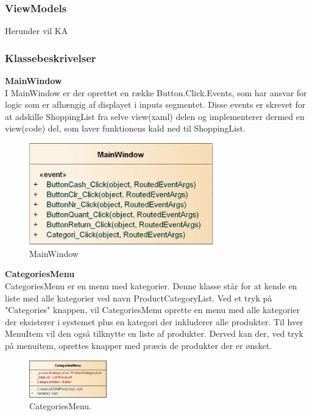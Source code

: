 \subsubsection{ViewModels} \label{VIEWMODELS}
Herunder vil \gls{KA}

\subsubsection{Klassebeskrivelser}
\textbf{MainWindow}\\
I MainWindow er der oprettet en række Button.Click.Events, som har ansvar for logic som er afhængig af displayet i inputs segmentet. Disse events er skrevet for at adskille ShoppingList fra selve view(xaml) delen og implementerer dermed en view(code) del, som laver funktionens kald ned til ShoppingList. 

\begin{figure}[H]
	\centering
	\includegraphics[width=80mm]{Systemdesign/Frontend/GUI/Pics/Main}
	\caption{MainWindow}
	\label{fig:KasseMainWindowClass}
\end{figure}

\textbf{CategoriesMenu}\\
CategoriesMenu er en menu med kategorier. Denne klasse står for at kende en liste med alle kategorier ved navn ProductCategoryList. Ved et tryk på "Categories" knappen, vil CategoriesMenu oprette en menu med alle kategorier der eksisterer i systemet plus en kategori der inkluderer alle produkter. Til hver MenuItem vil den også tilknytte en liste af produkter. Derved kan der, ved tryk på menuitem, oprettes knapper med præcis de produkter der er ønsket. 

\begin{figure}[H]
	\centering
	\includegraphics[width=0.3\textwidth]{Systemdesign/Frontend/pics/CategoriesMenu}
	\caption{CategoriesMenu.}
	\label{fig:PBC}
\end{figure}

